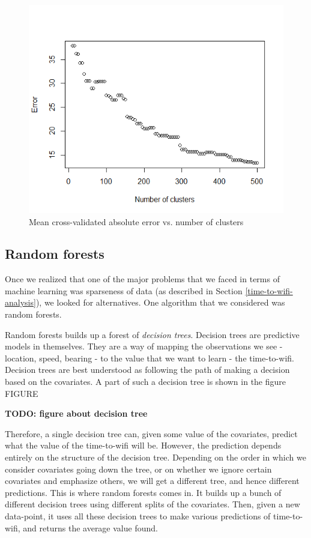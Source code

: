 \documentclass[12pt, fleqn]{article}
\begin{document}
\medskip
\begin{figure}[htp]
\centering
\includegraphics[scale=0.5]{img/num_clusters.png}
\caption{Mean cross-validated absolute error vs. number of clusters\label{fig-num-clusters}}
\end{figure}
\medskip

\subsection{Random forests}
\label{time-to-wifi-random-forests}

Once we realized that one of the major problems that we faced 
in terms of machine learning was sparseness of data (as described in Section \ref{time-to-wifi-analysis}), 
we looked for alternatives. One algorithm that we considered was random forests. 

Random forests builds up a forest of \emph{decision trees}. 
Decision trees are predictive models in themselves. They are a way of mapping the observations 
we see - location, speed, bearing - to the value that we want to learn - the 
time-to-wifi. Decision trees are best understood as following the path of making 
a decision based on the covariates. A part of such a decision tree is shown in the 
figure FIGURE

\textbf{TODO: figure about decision tree}

Therefore, a single decision tree can, given some value of the covariates, 
predict what the value of the time-to-wifi will be. However, the prediction 
depends entirely on the structure of the decision tree. Depending on the order 
in which we consider covariates going down the tree, or on whether we ignore 
certain covariates and emphasize others, we will get a different tree, and hence 
different predictions. This is where random forests comes in. It builds up a bunch 
of different decision trees using different splits of the covariates. 
Then, given a new data-point, it uses all these decision trees to make various 
predictions of time-to-wifi, and returns the average value found. 
\end{document}
